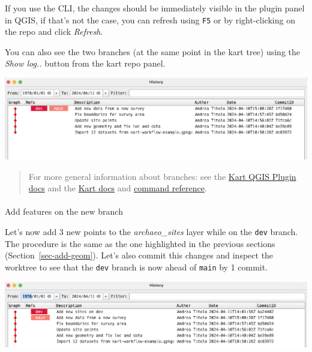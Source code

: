 \documentclass[
  letterpaper,
  DIV=11,
  numbers=noendperiod]{scrartcl}
\makeatletter
\let\oldparagraph\paragraph
\renewcommand{\paragraph}{
    \@ifstar
      \xxxParagraphStar
      \xxxParagraphNoStar
  }
\newcommand{\xxxParagraphStar}[1]{\oldparagraph*{#1}\mbox{}}
\newcommand{\xxxParagraphNoStar}[1]{\oldparagraph{#1}\mbox{}}
\makeatother
\begin{document}
If you use the CLI, the changes should be immediately visible in the
plugin panel in QGIS, if that's not the case, you can refresh using
\texttt{F5} or by right-clicking on the repo and click \emph{Refresh}.

You can also see the two branches (at the same point in the kart tree)
using the \emph{Show log..} button from the kart repo panel.

\begin{center}
\includegraphics{img/kart-panel-branches-log.png}
\end{center}

\begin{quote}
For more general information about branches: see the
\href{https://github.com/koordinates/kart-qgis-plugin/blob/main/docs/index.md\#working-with-branches}{Kart
QGIS Plugin docs} and the
\href{https://docs.kartproject.org/en/latest/pages/quick_guide.html\#branching}{Kart
docs} and
\href{https://docs.kartproject.org/en/latest/pages/command_reference.html\#branching-and-merging}{command
reference}.
\end{quote}

\paragraph{Add features on the new
branch}\label{add-features-on-the-new-branch}

Let's now add 3 new points to the \emph{archaeo\_sites} layer while on
the \texttt{dev} branch. The procedure is the same as the one
highlighted in the previous sections (Section~\ref{sec-add-geom}). Let's
also commit this changes and inspect the worktree to see that the
\texttt{dev} branch is now ahead of \texttt{main} by 1 commit.

\begin{center}
\includegraphics{img/kart-panel-dev-branch-ahead.png}
\end{center}
\end{document}
